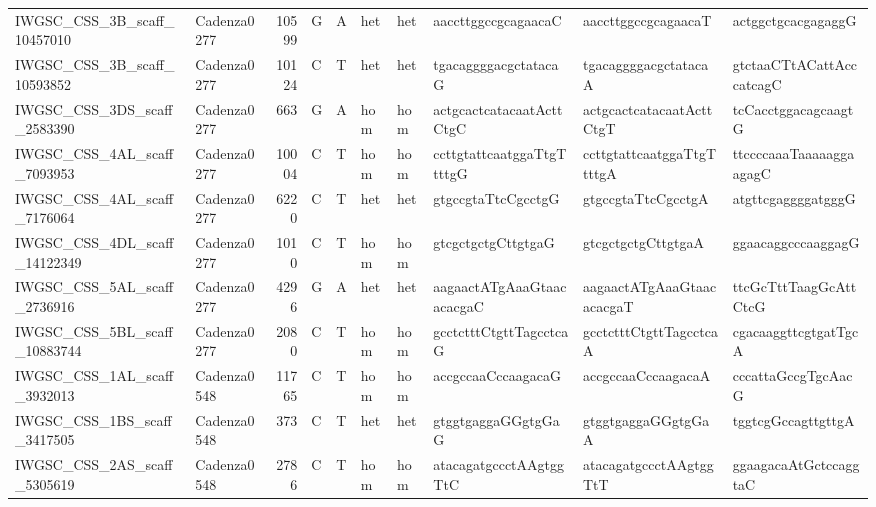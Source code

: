 \begin{longtable}{llrlllllll}
 IWGSC\_CSS\_3B\_scaff\_10457010  & Cadenza0277 &      10599 & G         & A        & het            & het         & aaccttggccgcagaacaC       & aaccttggccgcagaacaT       & actggctgcacgagaggG        \\
 IWGSC\_CSS\_3B\_scaff\_10593852  & Cadenza0277 &      10124 & C         & T        & het            & het         & tgacaggggacgctatacaG      & tgacaggggacgctatacaA      & gtctaaCTtACattAcccatcagC  \\
 IWGSC\_CSS\_3DS\_scaff\_2583390  & Cadenza0277 &        663 & G         & A        & hom            & hom         & actgcactcatacaatActtCtgC  & actgcactcatacaatActtCtgT  & tcCacctggacagcaagtG       \\
 IWGSC\_CSS\_4AL\_scaff\_7093953  & Cadenza0277 &      10004 & C         & T        & hom            & hom         & ccttgtattcaatggaTtgTtttgG & ccttgtattcaatggaTtgTtttgA & ttccccaaaTaaaaaggaagagC   \\
 IWGSC\_CSS\_4AL\_scaff\_7176064  & Cadenza0277 &       6220 & C         & T        & het            & het         & gtgccgtaTtcCgcctgG        & gtgccgtaTtcCgcctgA        & atgttcgaggggatgggG        \\
 IWGSC\_CSS\_4DL\_scaff\_14122349 & Cadenza0277 &       1010 & C         & T        & hom            & hom         & gtcgctgctgCttgtgaG        & gtcgctgctgCttgtgaA        & ggaacaggcccaaggagG        \\
 IWGSC\_CSS\_5AL\_scaff\_2736916  & Cadenza0277 &       4296 & G         & A        & het            & het         & aagaactATgAaaGtaacacacgaC & aagaactATgAaaGtaacacacgaT & ttcGcTttTaagGcAttCtcG     \\
 IWGSC\_CSS\_5BL\_scaff\_10883744 & Cadenza0277 &       2080 & C         & T        & hom            & hom         & gcctctttCtgttTagcctcaG    & gcctctttCtgttTagcctcaA    & cgacaaggttcgtgatTgcA      \\
 IWGSC\_CSS\_1AL\_scaff\_3932013  & Cadenza0548 &      11765 & C         & T        & hom            & hom         & accgccaaCccaagacaG        & accgccaaCccaagacaA        & cccattaGccgTgcAacG        \\
 IWGSC\_CSS\_1BS\_scaff\_3417505  & Cadenza0548 &        373 & C         & T        & het            & het         & gtggtgaggaGGgtgGaG        & gtggtgaggaGGgtgGaA        & tggtcgGccagttgttgA        \\
 IWGSC\_CSS\_2AS\_scaff\_5305619  & Cadenza0548 &       2786 & C         & T        & hom            & hom         & atacagatgccctAAgtggTtC    & atacagatgccctAAgtggTtT    & ggaagacaAtGctccaggtaC     \\

\end{longtable}
